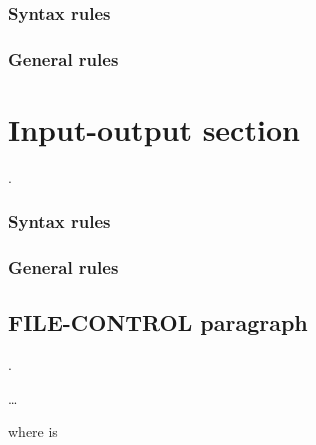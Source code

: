 \subsubsection{Syntax rules}

\subsubsection{General rules}

\section{Input-output section}

\begin{syntax}
  \begin{0-1}
     .
  \end{0-1}\newline
  \begin{0-1}
  \end{0-1}\newline
  \begin{0-1}
  \end{0-1}
\end{syntax}

\subsubsection{Syntax rules}

\subsubsection{General rules}

\subsection{FILE-CONTROL paragraph}

\begin{syntax}
  \begin{0-1}
    .
  \end{0-1}\newline
  \begin{0-1}
  \end{0-1} \ldots
\end{syntax}

where  is

